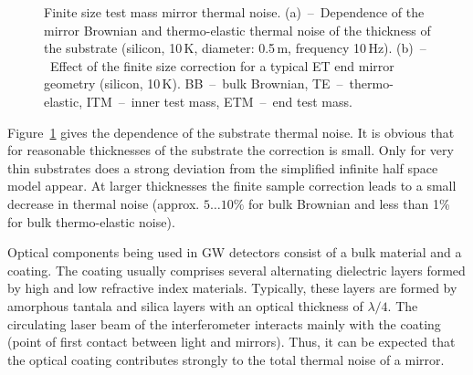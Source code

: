 \begin{figure}[!h]
\begin{center}
\end{center}
\caption{Finite size test mass mirror thermal noise. (a)~--~Dependence of the mirror Brownian and thermo-elastic thermal noise of the thickness of the substrate (silicon, 10\,K, diameter: 0.5\,m, frequency 10\,Hz). (b)~--~Effect of the finite size correction for a typical ET end mirror geometry (silicon, 10\,K). BB~--~bulk Brownian, TE~--~thermo-elastic, ITM~--~inner test mass, ETM~--~end test mass.}
\label{fig:bulk_TN_finite}
\end{figure}

Figure~\ref{fig:bulk_TN_finite} gives the dependence of the substrate thermal noise. It is obvious that for reasonable thicknesses of the substrate the correction is small. Only for very thin substrates does a strong deviation from the simplified infinite half space model appear. At larger thicknesses the finite sample correction leads to a small decrease in thermal noise (approx. $5\dots 10\%$ for bulk Brownian and less than 1\% for bulk thermo-elastic noise).

Optical components being used in GW detectors consist of a bulk material and a coating. The coating usually comprises several alternating dielectric layers formed by high and low refractive index materials. Typically, these layers are formed by amorphous tantala and silica layers with an optical thickness of $\lambda/4$. The circulating laser beam of the interferometer interacts mainly with the coating (point of first contact between light and mirrors). Thus, it can be expected that the optical coating contributes strongly to the total thermal noise of a mirror.

